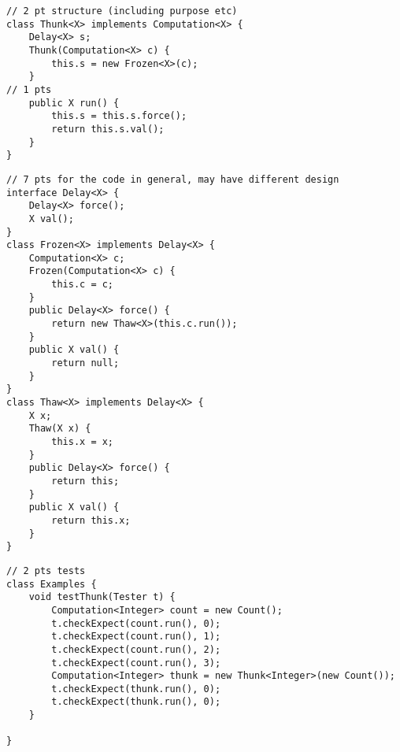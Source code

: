 \documentclass[12pt]{article}                   %
\newenvironment{solution}{\color{Red}}{}
\begin{document}
\begin{problem}
\begin{solution}
\newpage
\begin{verbatim}
// 2 pt structure (including purpose etc)
class Thunk<X> implements Computation<X> {
    Delay<X> s;
    Thunk(Computation<X> c) {
        this.s = new Frozen<X>(c);
    }
// 1 pts 
    public X run() {
        this.s = this.s.force();
        return this.s.val();
    }
}
\end{verbatim}
\newpage
\begin{verbatim}
// 7 pts for the code in general, may have different design
interface Delay<X> {
    Delay<X> force();
    X val();
}
class Frozen<X> implements Delay<X> {
    Computation<X> c;
    Frozen(Computation<X> c) {
        this.c = c;
    }
    public Delay<X> force() {
        return new Thaw<X>(this.c.run());
    }
    public X val() {
        return null;
    }
}
class Thaw<X> implements Delay<X> {
    X x;
    Thaw(X x) {
        this.x = x;
    }
    public Delay<X> force() {
        return this;
    }
    public X val() {
        return this.x;
    }
}
\end{verbatim}
\newpage
\begin{verbatim}
// 2 pts tests
class Examples {
    void testThunk(Tester t) {
        Computation<Integer> count = new Count();
        t.checkExpect(count.run(), 0);
        t.checkExpect(count.run(), 1);
        t.checkExpect(count.run(), 2);
        t.checkExpect(count.run(), 3);
        Computation<Integer> thunk = new Thunk<Integer>(new Count());
        t.checkExpect(thunk.run(), 0);
        t.checkExpect(thunk.run(), 0);
    }
    
}
\end{verbatim}
\end{solution}

\ifrubric
\else
{}
\fi
\newpage
\newpage

\end{problem}

\ifrubric
\else
{}
\fi
\newpage
\end{document}
